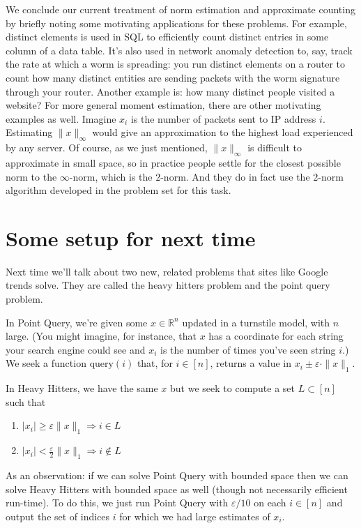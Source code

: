 \documentclass[11pt]{article}
\newcommand{\eps}{\varepsilon}
\begin{document}
We conclude our current treatment of norm estimation and approximate counting by briefly noting some motivating applications for these problems. For example, distinct elements is used in SQL to efficiently count distinct entries in some column of a data table. It's also used in network anomaly detection to, say, track the rate at which a worm is spreading: you run distinct elements on a router to count how many distinct entities are sending packets with the worm signature through your router. Another example is: how many distinct people visited a website? For more general moment estimation, there are other motivating examples as well. Imagine $x_i$ is the number of packets sent to IP address $i$. Estimating $\|x\|_\infty$ would give an approximation to the highest load experienced by any server. Of course, as we just mentioned, $\|x \|_\infty$ is difficult to approximate in small space, so in practice people settle for the closest possible norm to the $\infty$-norm, which is the $2$-norm. And they do in fact use the 2-norm algorithm developed in the problem set for this task.

\section{Some setup for next time}
Next time we'll talk about two new, related problems that sites like Google trends solve. They are called the heavy hitters problem and the point query problem.

In Point Query, we're given some $x \in \mathbb{R}^n$ updated in a turnstile model, with $n$ large. (You might imagine, for instance, that $x$ has a coordinate for each string your search engine could see and $x_i$ is the number of times you've seen string $i$.) We seek a function $\text{query}(i)$ that, for $i \in [n]$, returns a value in $x_i \pm \eps \cdot \|x\|_1$.

In Heavy Hitters, we have the same $x$ but we seek to compute a set $L \subset [n]$ such that
\begin{enumerate}
\item $|x_i| \geq \eps \|x\|_1 \Rightarrow i \in L$
\item $|x_i| < \frac{\eps}{2} \|x\|_1 \Rightarrow i \notin L$
\end{enumerate}

As an observation: if we can solve Point Query with bounded space then we can solve Heavy Hitters with bounded space as well (though not necessarily efficient run-time). To do this, we just run Point Query with $\eps/10$ on each $i \in [n]$ and output the set of indices $i$ for which we had large estimates of $x_i$.
\end{document}
